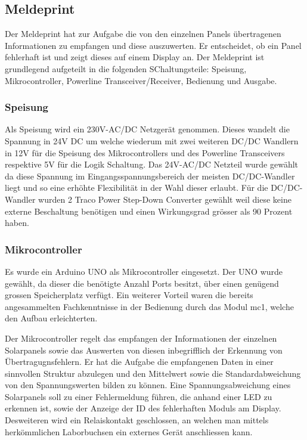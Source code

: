\subsection{Meldeprint}
Der Meldeprint hat zur Aufgabe die von den einzelnen Panels übertragenen Informationen zu empfangen und diese auszuwerten. Er entscheidet, ob ein Panel fehlerhaft ist und zeigt dieses auf einem Display an. Der Meldeprint ist grundlegend aufgeteilt in die folgenden SChaltungsteile: Speisung, Mikrocontroller, Powerline Transceiver/Receiver, Bedienung und Ausgabe.

\subsubsection{Speisung}
Als Speisung wird ein 230V-AC/DC Netzgerät genommen. Dieses wandelt die Spannung in 24V DC um welche wiederum mit zwei weiteren DC/DC Wandlern in 12V für die Speisung des Mikrocontrollers und des Powerline Transceivers respektive 5V für die Logik Schaltung. Das 24V-AC/DC Netzteil wurde gewählt da diese Spannung im Eingangsspannungsbereich der meisten DC/DC-Wandler liegt und so eine erhöhte Flexibilität in der Wahl dieser erlaubt. Für die DC/DC-Wandler wurden 2 Traco Power Step-Down Converter gewählt weil diese keine externe Beschaltung benötigen und einen Wirkungsgrad grösser als 90 Prozent haben.

\subsubsection{Mikrocontroller}
Es wurde ein Arduino UNO als Mikrocontroller eingesetzt. Der UNO wurde gewählt, da dieser die benötigte Anzahl Ports besitzt, über einen genügend grossen Speicherplatz verfügt. Ein weiterer Vorteil waren die bereits angesammelten Fachkenntnisse in der Bedienung durch das Modul mc1, welche den Aufbau erleichterten.

Der Mikrocontroller regelt das empfangen der Informationen der einzelnen Solarpanels sowie das Auswerten von diesen inbegrifflich der Erkennung von Übertragugnsfehlern. Er hat die Aufgabe die empfangenen Daten in einer sinnvollen Struktur abzulegen und den Mittelwert sowie die Standardabweichung von den Spannungswerten bilden zu können. Eine Spannungsabweichung eines Solarpanels soll zu einer Fehlermeldung führen, die anhand einer LED zu erkennen ist, sowie der Anzeige der ID des fehlerhaften Moduls am Display. Desweiteren wird ein Relaiskontakt geschlossen, an welchen man mittels herkömmlichen Laborbuchsen ein externes Gerät anschliessen kann.

